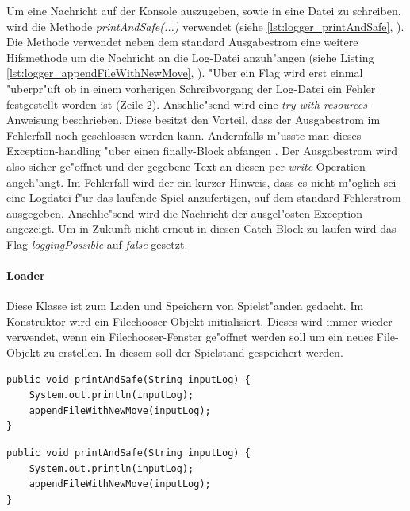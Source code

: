 Um eine Nachricht auf der Konsole auszugeben, sowie in eine Datei zu schreiben, wird die Methode \emph{printAndSafe(...)} verwendet (siehe \ref{lst:logger_printAndSafe}, ). Die Methode verwendet neben dem standard Ausgabestrom eine weitere Hifsmethode um die Nachricht an die Log-Datei anzuh"angen (siehe Listing \ref{lst:logger_appendFileWithNewMove}, ). "Uber ein Flag wird erst einmal "uberpr"uft ob in einem vorherigen Schreibvorgang der Log-Datei ein Fehler festgestellt worden ist (Zeile 2). Anschlie"send wird eine \emph{try-with-resources}-Anweisung beschrieben. Diese besitzt den Vorteil, dass der Ausgabestrom im Fehlerfall noch geschlossen werden kann. Andernfalls m"usste man dieses Exception-handling "uber einen finally-Block abfangen
\cite{try-with-resources}
. Der Ausgabestrom wird also sicher ge"offnet und der gegebene Text an diesen per \emph{write}-Operation angeh"angt. Im Fehlerfall wird der ein kurzer Hinweis, dass es nicht m"oglich sei eine Logdatei f"ur das laufende Spiel anzufertigen, auf dem standard Fehlerstrom ausgegeben. Anschlie"send wird die Nachricht der ausgel"osten Exception angezeigt. Um in Zukunft nicht erneut in diesen Catch-Block zu laufen wird das Flag \emph{loggingPossible} auf \emph{false} gesetzt. 

\paragraph{Loader}
\label{par:loader}
Diese Klasse ist zum Laden und Speichern von Spielst"anden gedacht. Im Konstruktor wird ein Filechooser-Objekt initialisiert. Dieses wird immer wieder verwendet, wenn ein Filechooser-Fenster ge"offnet werden soll um ein neues File-Objekt zu erstellen. In diesem soll der Spielstand gespeichert werden.

\begin{lstlisting}[float,style=CodeHighlighting,caption=Logger - printAndSafe,label=lst:logger_printAndSafe]
public void printAndSafe(String inputLog) {
    System.out.println(inputLog);
    appendFileWithNewMove(inputLog);
}
\end{lstlisting}

\begin{lstlisting}[float,style=CodeHighlighting,caption=Logger - printAndSafe,label=lst:logger_printAndSafe]
public void printAndSafe(String inputLog) {
    System.out.println(inputLog);
    appendFileWithNewMove(inputLog);
}
\end{lstlisting}

